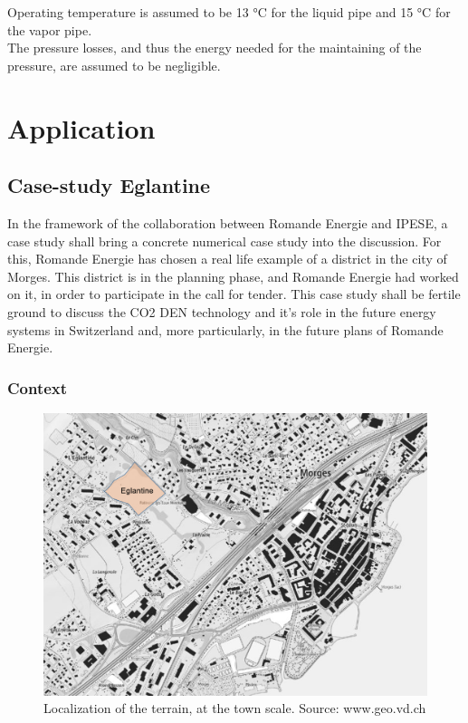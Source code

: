 \documentclass{article}
\begin{document}
Operating temperature is assumed to be 13 \si{\celsius} for the liquid pipe and 15 \si{\celsius} for the vapor pipe\cite{suciuEnergyautonomousCitiesUsing2016}.\\

The pressure losses, and thus the energy needed for the maintaining of the pressure, are assumed to be negligible.

\newpage
\section{Application}

\subsection{Case-study Eglantine}\label{ss:Eglantine}
In the framework of the collaboration between Romande Energie and IPESE, a case study shall bring a concrete numerical case study into the discussion. For this, Romande Energie has chosen a real life example of a district in the city of Morges. This district is in the planning phase, and Romande Energie had worked on it, in order to participate in the call for tender. This case study shall be fertile ground to discuss the CO2 DEN technology and it's role in the future energy systems in Switzerland and, more particularly, in the future plans of Romande Energie.

\subsubsection{Context}

\begin{figure}[htp]
\centering
\includegraphics[width=1\textwidth]{morges.png}
\caption{Localization of the terrain, at the town scale. Source: www.geo.vd.ch}
\label{fig:morges}
\end{figure}
\end{document}
